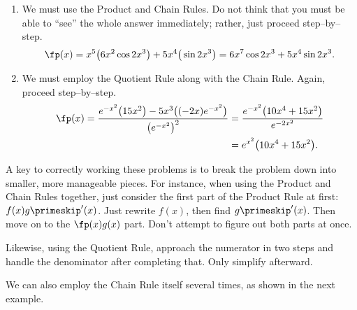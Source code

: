 {
\begin{enumerate}
\item		We must use the Product and Chain Rules. Do not think that you must be able to ``see'' the whole answer immediately; rather, just proceed step--by--step.
		\[
		\fp(x) = x^5\big(6x^2\cos 2x^3\big) + 5x^4\big(\sin 2x^3\big)= 6x^7\cos2x^3+5x^4\sin 2x^3.
		\]
\item		We must employ the Quotient Rule along with the Chain Rule. Again, proceed step--by--step.
\begin{align*}
\fp(x) = \frac{e^{-x^2}\big(15x^2\big) - 5x^3\big((-2x)e^{-x^2}\big)}{\big(e^{-x^2}\big)^2} &=\frac{e^{-x^2}\big(10x^4+15x^2\big)}{e^{-2x^2}}\\
 &= e^{x^2}\big(10x^4+15x^2\big).
\end{align*}
\end{enumerate}
\baselineskip
}\pagebreak

A key to correctly working these problems is to break the problem down into smaller, more manageable pieces. For instance, when using the Product and Chain Rules together, just consider the first part of the Product Rule at first: $f(x)g\primeskip'(x)$. Just rewrite $f(x)$, then find $g\primeskip'(x)$. Then move on to the $\fp(x)g(x)$ part. Don't attempt to figure out both parts at once.

Likewise, using the Quotient Rule, approach the numerator in two steps and handle the denominator after completing that. Only simplify afterward.

We can also employ the Chain Rule itself several times, as shown in the next example.\\

